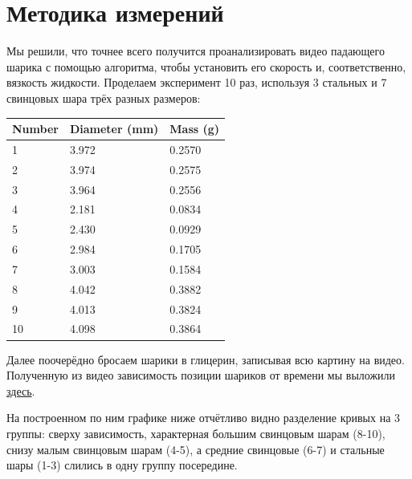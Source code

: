 \documentclass[a4paper, 12pt]{article}
\begin{document}
    \section{Методика измерений}

    Мы решили, что точнее всего получится проанализировать видео падающего шарика с помощью алгоритма,
    чтобы установить его скорость и, соответственно, вязкость жидкости.
    Проделаем эксперимент 10 раз, используя 3 стальных и 7 свинцовых шара трёх разных размеров:

    \vspace{1.5em}
    \begin{tabular}{l l l}
        \bfseries Number & \bfseries Diameter (mm) & \bfseries Mass (g) \\ \hline
        1                & 3.972                   & 0.2570             \\ \hline
        2                & 3.974                   & 0.2575             \\ \hline
        3                & 3.964                   & 0.2556             \\ \hline
        4                & 2.181                   & 0.0834             \\ \hline
        5                & 2.430                   & 0.0929             \\ \hline
        6                & 2.984                   & 0.1705             \\ \hline
        7                & 3.003                   & 0.1584             \\ \hline
        8                & 4.042                   & 0.3882             \\ \hline
        9                & 4.013                   & 0.3824             \\ \hline
        10               & 4.098                   & 0.3864             \\ \hline
    \end{tabular}
    \vspace{1.5em}

    Далее поочерёдно бросаем шарики в глицерин, записывая всю картину на видео.
    Полученную из видео зависимость позиции шариков от времени мы выложили
    \href{https://github.com/phys-labs-at-hse/glycerine/tree/master/particular_balls}{здесь}.

    На построенном по ним графике ниже отчётливо видно разделение кривых на 3 группы: сверху зависимость,
    характерная большим свинцовым шарам (8-10), снизу малым свинцовым шарам (4-5),
    а средние свинцовые (6-7) и стальные шары (1-3) слились в одну группу посередине.
\end{document}
